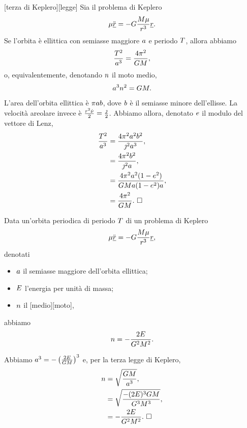 \begin{Theorem}
	[terza di Keplero][legge] 
	Sia il problema di Keplero
	\[
		\mu \ddot{\underline{r}} = - G \frac{M\mu}{r^3}\underline{r}.
	\]
	Se l'orbita \`e ellittica con semiasse maggiore $a$ e periodo $T$, allora abbiamo
	\[
		\frac{T^2}{a^3} = \frac{4\pi^2}{GM},
	\]
	o, equivalentemente, denotando $n$ il moto medio,
	\[
		a^3n^2 = GM.
	\]
\end{Theorem}
\Proof L'area dell'orbita ellittica \`e $\pi ab$, dove $b$ \`e il semiasse minore dell'ellisse. La velocit\`a areolare invece \`e $\frac{r^2\dot{\nu}}{2} = \frac{\jmath}{2}$.
Abbiamo allora, denotato $e$ il modulo del vettore di Lenz,
\begin{align*}
	\frac{T^2}{a^3}
	&= \frac{4 \pi^2a^2b^2}{\jmath^2a^3},\\
	&= \frac{4 \pi^2b^2}{\jmath^2a},\\
	&= \frac{4 \pi^2 a^2(1 - e^2)}{GMa(1 - e^2)a},\\
	&= \frac{4 \pi^2}{GM}.\text{ $\square$}
\end{align*}
\begin{Definition}
	Data un'orbita periodica di periodo $T$ di un problema di Keplero
	\[
		\mu \ddot{\underline{r}} = - G \frac{M\mu}{r^3}\underline{r},
	\]
	denotati
	\begin{itemize}
		\item $a$ il semiasse maggiore dell'orbita ellittica;
		\item $E$ l'energia per unit\`a di massa;
		\item $n$ il [medio][moto],
	\end{itemize}
	abbiamo
	\[
		n = - \frac{2 E}{G^2M^2}.
	\]
\end{Definition}
\Proof Abbiamo $a^3 = - \left ( \frac{2 E}{GM} \right )^3$ e, per la terza legge di Keplero,
\begin{align*}
	n
	&= \sqrt{\frac{GM}{a^3}},\\
	&= \sqrt{\frac{ - (2 E)^3 GM}{G^3M^3}},\\
	&= - \frac{2 E}{G^2M^2}.\text{ $\square$}
\end{align*}
